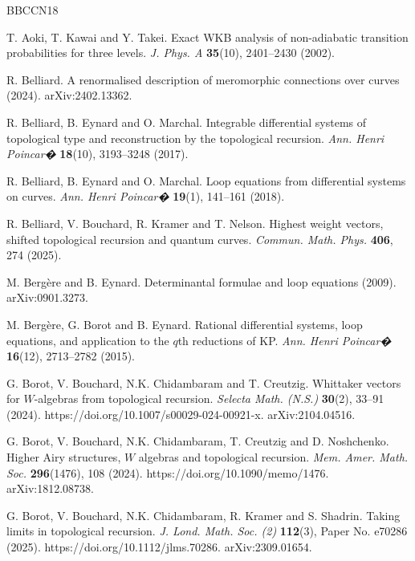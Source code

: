 \documentclass[reqno,11pt]{amsart}
\theoremstyle{plain}
\theoremstyle{definition}
\theoremstyle{remark}
\numberwithin{equation}{section}
\newcommand{\1}{\mathds{1}}
\newcommand{\2}{\frac{1}{2}}
\begin{document}
{	\begin{thebibliography}{BBCCN18}
		
		T. Aoki, T. Kawai and Y. Takei. Exact WKB analysis of non-adiabatic transition probabilities for three levels. \textit{J. Phys. A} \textbf{35}(10), 2401--2430 (2002).
		
		R. Belliard. A renormalised description of meromorphic connections over curves (2024). arXiv:2402.13362.
		
		R. Belliard, B. Eynard and O. Marchal. Integrable differential systems of topological type and reconstruction by the topological recursion. \textit{Ann. Henri Poincar�} \textbf{18}(10), 3193--3248 (2017). 
		
		R. Belliard, B. Eynard and O. Marchal. Loop equations from differential systems on curves. \textit{Ann. Henri Poincar�} \textbf{19}(1), 141--161 (2018). 
		
		R. Belliard, V. Bouchard, R. Kramer and T. Nelson. Highest weight vectors, shifted topological recursion and quantum curves. \textit{Commun. Math. Phys.} \textbf{406}, 274 (2025).
		
		M. Berg\`ere and B. Eynard. Determinantal formulae and loop equations (2009). arXiv:0901.3273.
		
		M. Berg\`ere, G. Borot and B. Eynard. Rational differential systems, loop equations, and application to the $q$th reductions of KP. \textit{Ann. Henri Poincar�} \textbf{16}(12), 2713--2782 (2015). 
		
		G. Borot, V. Bouchard, N.K. Chidambaram and T. Creutzig. Whittaker vectors for $W$-algebras from topological recursion. \textit{Selecta Math. (N.S.)} \textbf{30}(2), 33--91 (2024). https://doi.org/10.1007/s00029-024-00921-x. arXiv:2104.04516.
		
		G. Borot, V. Bouchard, N.K. Chidambaram, T. Creutzig and D. Noshchenko. Higher Airy structures, $W$ algebras and topological recursion. \textit{Mem. Amer. Math. Soc.} \textbf{296}(1476), 108 (2024). https://doi.org/10.1090/memo/1476. arXiv:1812.08738.
		
		G. Borot, V. Bouchard, N.K. Chidambaram, R. Kramer and S. Shadrin. Taking limits in topological recursion. \textit{J. Lond. Math. Soc. (2)} \textbf{112}(3), Paper No. e70286 (2025). https://doi.org/10.1112/jlms.70286. arXiv:2309.01654.
		

\end{thebibliography}}
\end{document}
